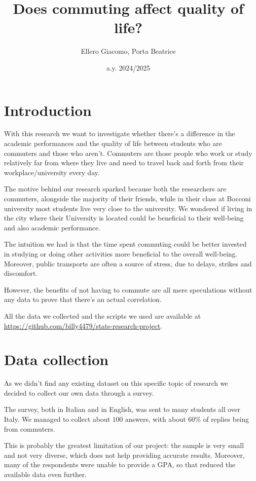 \documentclass[12pt]{extarticle}
\title{Does commuting affect quality of life?}
\author{Ellero Giacomo, Porta Beatrice}
\date{a.y. 2024/2025}
\numberwithin{table}{section}
\numberwithin{figure}{section}
\numberwithin{equation}{section}
\begin{document}
\maketitle

\section{Introduction}

With this research we want to investigate whether there’s a difference in the academic performances
and the quality of life between students who are commuters and those who aren't.
Commuters are those people who work or study relatively far from where they live
and need to travel back and forth from their workplace/university every day.

The motive behind our research sparked because both the researchers are commuters,
alongside the majority of their friends, while in their class at Bocconi university most students
live very close to the university.
We wondered if living in the city where their University is located could be beneficial
to their well-being and also academic performance.

The intuition we had is that the time spent commuting could be better invested in studying
or doing other activities more beneficial to the overall well-being.
Moreover, public transports are often a source of stress, due to delays, strikes and discomfort.

However, the benefits of not having to commute are all mere speculations without any data to prove
that there’s an actual correlation.

All the data we collected and the scripts we used are available at
\url{https://github.com/billy4479/stats-research-project}.

\section{Data collection}

As we didn't find any existing dataset on this specific topic of research we decided
to collect our own data through a survey.

The survey, both in Italian and in English, was sent to many students all over Italy.
We managed to collect about $100$ answers, with about $60\%$ of replies being from commuters.

This is probably the greatest limitation of our project:
the sample is very small and not very diverse, which does not help providing accurate results.
Moreover, many of the respondents were unable to provide a GPA,
so that reduced the available data even further.
\end{document}
